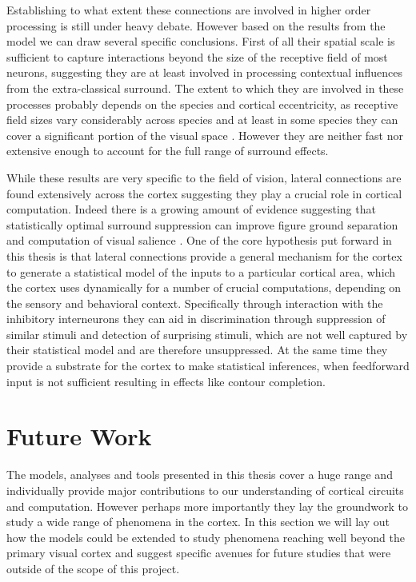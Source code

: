 Establishing to what extent these connections are involved in higher
order processing is still under heavy debate. However based on the
results from the model we can draw several specific conclusions. First
of all their spatial scale is sufficient to capture interactions
beyond the size of the receptive field of most neurons, suggesting
they are at least involved in processing contextual influences from
the extra-classical surround. The extent to which they are involved in
these processes probably depends on the species and cortical
eccentricity, as receptive field sizes vary considerably across
species and at least in some species they can cover a significant
portion of the visual space \citep{Bosking1997}. However they are
neither fast nor extensive enough to account for the full range of
surround effects.

While these results are very specific to the field of vision, lateral
connections are found extensively across the cortex suggesting they
play a crucial role in cortical computation. Indeed there is a growing
amount of evidence suggesting that statistically optimal surround
suppression can improve figure ground separation and computation of
visual salience \citep{Coen-Cagli2013, Coen2015}. One of the core hypothesis
put forward in this thesis is that lateral connections provide a
general mechanism for the cortex to generate a statistical model of
the inputs to a particular cortical area, which the cortex uses
dynamically for a number of crucial computations, depending on the
sensory and behavioral context. Specifically through interaction with
the inhibitory interneurons they can aid in discrimination through
suppression of similar stimuli and detection of surprising stimuli,
which are not well captured by their statistical model and are
therefore unsuppressed. At the same time they provide a substrate for
the cortex to make statistical inferences, when feedforward input is
not sufficient resulting in effects like contour completion.

\section{Future Work}

The models, analyses and tools presented in this thesis cover a huge
range and individually provide major contributions to our
understanding of cortical circuits and computation. However perhaps
more importantly they lay the groundwork to study a wide range of
phenomena in the cortex. In this section we will lay out how the
models could be extended to study phenomena reaching well beyond the
primary visual cortex and suggest specific avenues for future studies
that were outside of the scope of this project.

